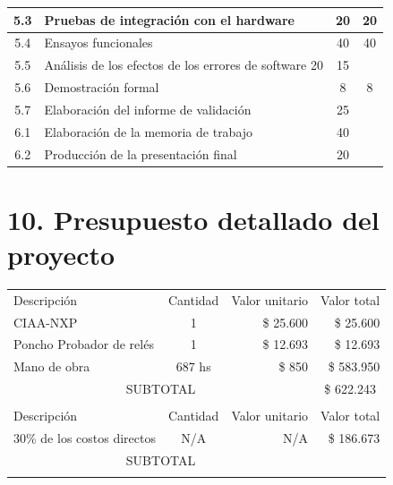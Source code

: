 \documentclass[11pt]{charter}
\begin{document}
\begin{table}[H]
\begin{tabularx}{\linewidth}{@{}|c|X|c|c|@{}}
 5.3 & Pruebas de integración con el hardware & 20 & 20 \\ \hline
 5.4 & Ensayos funcionales & 40 & 40 \\ \hline
 5.5 & Análisis de los efectos de los errores de software 20 & 15 & \\ \hline
 5.6 & Demostración formal & 8 & 8 \\ \hline
 5.7 & Elaboración del informe de validación & 25 & \\ \hline 
 6.1 & Elaboración de la memoria de trabajo & 40 & \\ \hline 
 6.2 & Producción de la presentación final & 20 & \\ \hline 
\end{tabularx}%
\end{table}


\section{10. Presupuesto detallado del proyecto}
\label{sec:presupuesto}

\begin{table}[H]
\centering
\begin{tabularx}{\linewidth}{@{}|X|c|r|r|@{}}
\hline
\rowcolor[HTML]{C0C0C0} 
\multicolumn{4}{|c|}{\cellcolor[HTML]{C0C0C0}COSTOS DIRECTOS} \\ \hline
\rowcolor[HTML]{C0C0C0} 
Descripción &
  \multicolumn{1}{c|}{\cellcolor[HTML]{C0C0C0}Cantidad} &
  \multicolumn{1}{c|}{\cellcolor[HTML]{C0C0C0}Valor unitario} &
  \multicolumn{1}{c|}{\cellcolor[HTML]{C0C0C0}Valor total} \\ \hline
CIAA-NXP                 & 1        & \$ 25.600  & \$ 25.600  \\  \hline
Poncho Probador de relés & 1        & \$ 12.693        & \$ 12.693     \\ \hline
Mano de obra             & 687 hs   & \$ 850     & \$ 583.950 \\ \hline
\multicolumn{3}{|c|}{SUBTOTAL} &
  \multicolumn{1}{c|}{\$ 622.243} \\ \hline
\rowcolor[HTML]{C0C0C0} 
\multicolumn{4}{|c|}{\cellcolor[HTML]{C0C0C0}COSTOS INDIRECTOS} \\ \hline
\rowcolor[HTML]{C0C0C0}
Descripción &
  \multicolumn{1}{c|}{\cellcolor[HTML]{C0C0C0}Cantidad} &
  \multicolumn{1}{c|}{\cellcolor[HTML]{C0C0C0}Valor unitario} &
  \multicolumn{1}{c|}{\cellcolor[HTML]{C0C0C0}Valor total} \\ \hline
30\% de los costos directos & N/A & N/A & \$ 186.673  \\  \hline
\multicolumn{3}{|c|}{SUBTOTAL} &
  \multicolumn{1}{c|}{} \\ \hline
\rowcolor[HTML]{C0C0C0}
\multicolumn{3}{|c|}{TOTAL} &
   \\ \hline
\end{tabularx}%
\end{table}
\end{document}
